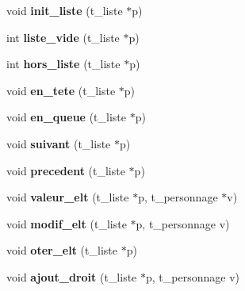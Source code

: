 \begin{DoxyCompactItemize}
\item 
void {\bfseries init\+\_\+liste} (t\+\_\+liste $\ast$p)\hypertarget{a00008_ae54cf55c0d15211e5433ce9b5abf099d}{}\label{a00008_ae54cf55c0d15211e5433ce9b5abf099d}

\item 
int {\bfseries liste\+\_\+vide} (t\+\_\+liste $\ast$p)\hypertarget{a00008_ae25051845f03a0ee659aed8e855dad5b}{}\label{a00008_ae25051845f03a0ee659aed8e855dad5b}

\item 
int {\bfseries hors\+\_\+liste} (t\+\_\+liste $\ast$p)\hypertarget{a00008_aa42eefd0ac04de255ffb11f5e9fdabd6}{}\label{a00008_aa42eefd0ac04de255ffb11f5e9fdabd6}

\item 
void {\bfseries en\+\_\+tete} (t\+\_\+liste $\ast$p)\hypertarget{a00008_a9a2af94927570339b5708b99c4831cf3}{}\label{a00008_a9a2af94927570339b5708b99c4831cf3}

\item 
void {\bfseries en\+\_\+queue} (t\+\_\+liste $\ast$p)\hypertarget{a00008_a182d1a7bdc30807ebdd00d566994548d}{}\label{a00008_a182d1a7bdc30807ebdd00d566994548d}

\item 
void {\bfseries suivant} (t\+\_\+liste $\ast$p)\hypertarget{a00008_ac95aadbae271f7e76ca486b6187dd8dd}{}\label{a00008_ac95aadbae271f7e76ca486b6187dd8dd}

\item 
void {\bfseries precedent} (t\+\_\+liste $\ast$p)\hypertarget{a00008_a580b4a7d8c45590284303c3d1103a3e3}{}\label{a00008_a580b4a7d8c45590284303c3d1103a3e3}

\item 
void {\bfseries valeur\+\_\+elt} (t\+\_\+liste $\ast$p, t\+\_\+personnage $\ast$v)\hypertarget{a00008_ac7ee699d71e8dda4e6f64a30fc487a4a}{}\label{a00008_ac7ee699d71e8dda4e6f64a30fc487a4a}

\item 
void {\bfseries modif\+\_\+elt} (t\+\_\+liste $\ast$p, t\+\_\+personnage v)\hypertarget{a00008_a85cff63c489af0391880672f3c039e47}{}\label{a00008_a85cff63c489af0391880672f3c039e47}

\item 
void {\bfseries oter\+\_\+elt} (t\+\_\+liste $\ast$p)\hypertarget{a00008_a405c291cfedcbb6077322f032ac99fb3}{}\label{a00008_a405c291cfedcbb6077322f032ac99fb3}

\item 
void {\bfseries ajout\+\_\+droit} (t\+\_\+liste $\ast$p, t\+\_\+personnage v)\hypertarget{a00008_af63f749e5d177cf431f219915e24a76d}{}\label{a00008_af63f749e5d177cf431f219915e24a76d}


\end{DoxyCompactItemize}
